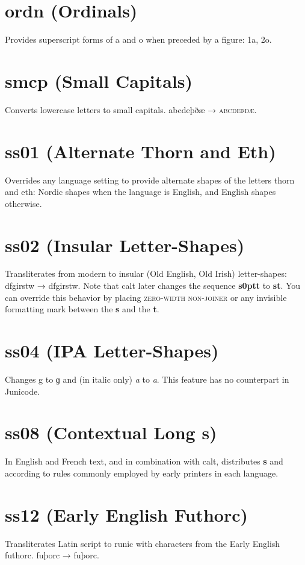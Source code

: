\documentclass[12pt,letterpaper,openany]{book}
\begin{document}
\section{ordn (Ordinals)}
Provides superscript forms of a and o when preceded by a figure:
{ 1a, 2o}.

\section{smcp (Small Capitals)}
Converts lowercase letters to small capitals. abcdeþðæ → \textsc{abcdeþðæ}.

\section{ss01 (Alternate Thorn and Eth)}
Overrides any language setting to provide alternate shapes of the letters thorn and eth: Nordic shapes when the language is English, and English shapes otherwise.

\section{ss02 (Insular Letter-Shapes)}
Transliterates from modern to insular (Old English, Old Irish) letter-shapes:\linebreak
dfgirstw → { dfgirstw}. Note that calt later
changes the sequence \textbf{ s\kern0ptt}
to \textbf{ st}. You can override this behavior by placing
 \textsc{zero-width non-joiner} or any invisible formatting mark
between the \textbf{s} and the \textbf{t}.

\section{ss04 (IPA Letter-Shapes)}
Changes g to ɡ and (in italic only)
\textit{a} to \textit{ a}. This feature has no counterpart in
Junicode.

\section{ss08 (Contextual Long s)}
In English and French text, and in combination with calt, distributes \textbf{s} and
\textbf{}
according to rules commonly employed by early printers in each language.

\section{ss12 (Early English Futhorc)}
Transliterates Latin script to runic with characters from the Early English futhorc. fuþorc
→ { fuþorc}.
\end{document}
